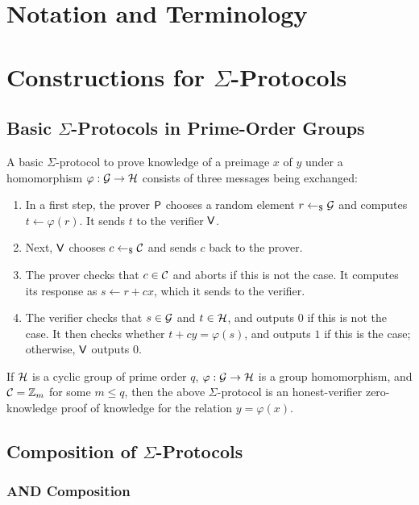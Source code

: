 \documentclass[runningheads]{llncs}
\begin{document}
\section{Notation and Terminology}


\section{Constructions for $\Sigma$-Protocols}
\subsection{Basic $\Sigma$-Protocols in Prime-Order Groups}
A basic $\Sigma$-protocol to prove knowledge of a preimage $x$ of $y$ under a homomorphism $\varphi:\mathcal{G}\to\mathcal{H}$ consists of three messages being exchanged:

\begin{enumerate}
  \item
    In a first step, the prover $\mathsf{P}$ chooses a random element $r\gets_{\$}\mathcal{G}$ and computes $t\gets\varphi(r)$.
	It sends $t$ to the verifier $\mathsf{V}$.
  \item
    Next, $\mathsf{V}$ chooses $c\gets_{\$}\mathcal{C}$ and sends $c$ back to the prover.
  \item
    The prover checks that $c\in\mathcal{C}$ and aborts if this is not the case.
	It computes its response as $s\gets r+cx$, which it sends to the verifier.
  \item
    The verifier checks that $s\in\mathcal{G}$ and $t\in\mathcal{H}$, and outputs $0$ if this is not the case.
	It then checks whether $t + cy = \varphi(s)$, and outputs $1$ if this is the case; otherwise, $\mathsf{V}$ outputs $0$.
\end{enumerate}

\begin{theorem}
  If $\mathcal{H}$ is a cyclic group of prime order $q$, $\varphi:\mathcal{G}\to\mathcal{H}$ is a group homomorphism, and $\mathcal{C}=\mathbb{Z}_m$ for some $m\leq q$, then the above $\Sigma$-protocol is an honest-verifier zero-knowledge proof of knowledge for the relation $y=\varphi(x)$.
\end{theorem}

\subsection{Composition of $\Sigma$-Protocols}
\subsubsection{AND Composition}
\end{document}
